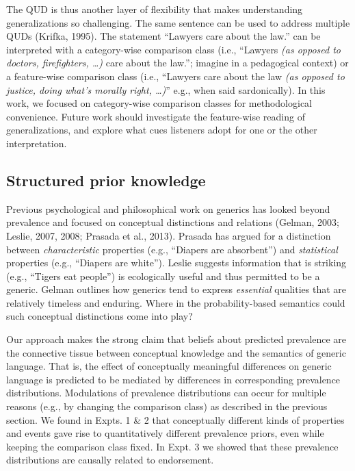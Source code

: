 \documentclass[english,floatsintext,man]{apa6}
\theoremstyle{definition}
\theoremstyle{definition}
\theoremstyle{definition}
\theoremstyle{remark}
\begin{document}
The QUD is thus another layer of flexibility that makes understanding
generalizations so challenging. The same sentence can be used to address
multiple QUDs (Krifka, 1995). The statement \enquote{Lawyers care about
the law.} can be interpreted with a category-wise comparison class
(i.e., \enquote{Lawyers \emph{(as opposed to doctors, firefighters,
\ldots{})} care about the law.}; imagine in a pedagogical context) or a
feature-wise comparison class (i.e., \enquote{Lawyers care about the law
\emph{(as opposed to justice, doing what's morally right, \ldots{})}}
e.g., when said sardonically). In this work, we focused on category-wise
comparison classes for methodological convenience. Future work should
investigate the feature-wise reading of generalizations, and explore
what cues listeners adopt for one or the other interpretation.

\subsection{Structured prior
knowledge}\label{structured-prior-knowledge}

Previous psychological and philosophical work on generics has looked
beyond prevalence and focused on conceptual distinctions and relations
(Gelman, 2003; Leslie, 2007, 2008; Prasada et al., 2013). Prasada has
argued for a distinction between \emph{characteristic} properties (e.g.,
\enquote{Diapers are absorbent}) and \emph{statistical} properties
(e.g., \enquote{Diapers are white}). Leslie suggests information that is
striking (e.g., \enquote{Tigers eat people}) is ecologically useful and
thus permitted to be a generic. Gelman outlines how generics tend to
express \emph{essential} qualities that are relatively timeless and
enduring. Where in the probability-based semantics could such conceptual
distinctions come into play?

Our approach makes the strong claim that beliefs about predicted
prevalence are the connective tissue between conceptual knowledge and
the semantics of generic language. That is, the effect of conceptually
meaningful differences on generic language is predicted to be mediated
by differences in corresponding prevalence distributions. Modulations of
prevalence distributions can occur for multiple reasons (e.g., by
changing the comparison class) as described in the previous section. We
found in Expts. 1 \& 2 that conceptually different kinds of properties
and events gave rise to quantitatively different prevalence priors, even
while keeping the comparison class fixed. In Expt. 3 we showed that
these prevalence distributions are causally related to endorsement.
\end{document}
